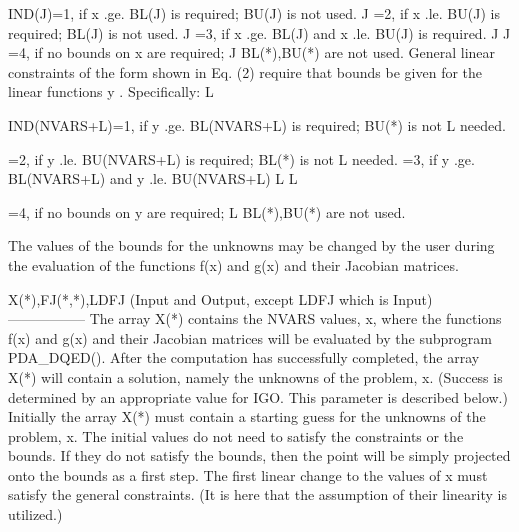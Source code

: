 \documentclass[11pt,twoside,nolof]{starlink}
\begin{document}
\begin{terminalv}
  IND(J)=1, if x .ge. BL(J) is required; BU(J) is not used.
                J
        =2, if x .le. BU(J) is required; BL(J) is not used.
                J
        =3, if x .ge. BL(J) and x .le. BU(J) is required.
                J                J
        =4, if no bounds on x  are required;
                             J
                BL(*),BU(*) are not used.
  General  linear constraints of the form shown in Eq. (2) require
  that bounds be given for the linear functions y .  Specifically:
                                                 L

  IND(NVARS+L)=1,  if y .ge. BL(NVARS+L) is required; BU(*) is not
                       L
                 needed.

              =2, if y .le. BU(NVARS+L) is required; BL(*) is not
                      L
                  needed.
              =3, if y .ge. BL(NVARS+L) and y .le. BU(NVARS+L)
                      L                      L

              =4, if no bounds on y  are required;
                                   L
                  BL(*),BU(*) are not used.

  The  values of the bounds for the unknowns may be changed by the
  user  during  the  evaluation of the functions f(x) and g(x) and
  their Jacobian matrices.

  X(*),FJ(*,*),LDFJ (Input and Output, except LDFJ which is Input)
  -----------------
  The  array  X(*)  contains  the  NVARS  values,  x,   where  the
  functions  f(x)  and  g(x)  and  their Jacobian matrices will be
  evaluated  by  the subprogram PDA_DQED().  After the computation has
  successfully  completed, the array X(*) will contain a solution,
  namely  the  unknowns of the problem, x.  (Success is determined
  by  an  appropriate  value for IGO.  This parameter is described
  below.)  Initially  the array X(*) must contain a starting guess
  for  the  unknowns of the problem, x.  The initial values do not
  need  to  satisfy the constraints or the bounds.  If they do not
  satisfy the bounds, then the point will be simply projected onto
  the  bounds  as  a  first  step.  The first linear change to the
  values  of  x must satisfy the general constraints.  (It is here
  that the assumption of their linearity is utilized.)


\end{terminalv}
\end{document}
